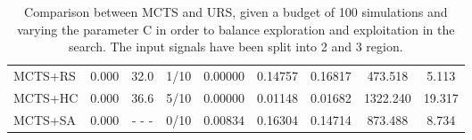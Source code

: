 \documentclass[11pt]{article}
\begin{document}
\begin{table}[ht]
\begin{tabular}{|l|l|c|c|c|c|c|c|c|}
MCTS+RS                                     & 0.000              &  32.0                   & 1/10                          & 0.00000  & 0.14757  & 0.16817  &  473.518   &  5.113       \\
MCTS+HC                                     & 0.000              &  36.6                   & 5/10                          & 0.00000  & 0.01148  & 0.01682  & 1322.240   & 19.317       \\
MCTS+SA                                     & 0.000              & - - -                   & 0/10                          & 0.00834  & 0.16304  & 0.14714  &  873.488   &  8.734       \\ \hline
\end{tabular}
\caption{Comparison between MCTS and URS, given a budget of 100 simulations and varying the parameter C in order to balance exploration and exploitation in the search. The input signals have been split into 2 and 3 region.}
\end{table}
\end{document}
